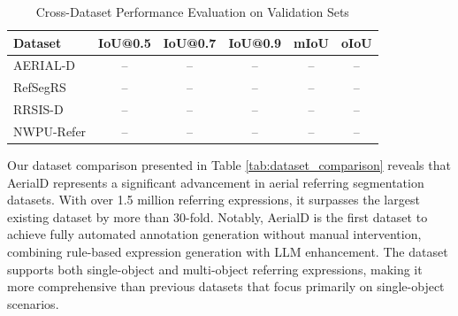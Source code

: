 \begin{table}[H]
\centering
\caption{Cross-Dataset Performance Evaluation on Validation Sets}
\label{tab:cross_dataset_results}
\begin{tabular}{@{}lccccc@{}}
\toprule
\textbf{Dataset} & \textbf{IoU@0.5} & \textbf{IoU@0.7} & \textbf{IoU@0.9} & \textbf{mIoU} & \textbf{oIoU} \\
\midrule
AERIAL-D & -- & -- & -- & -- & -- \\
RefSegRS & -- & -- & -- & -- & -- \\
RRSIS-D & -- & -- & -- & -- & -- \\
NWPU-Refer & -- & -- & -- & -- & -- \\
\bottomrule
\end{tabular}
\end{table}

\begin{table}[H]
\centering
\caption{Comparison with Existing RRSIS Datasets}
\label{tab:dataset_comparison}
\end{table}

Our dataset comparison presented in Table \ref{tab:dataset_comparison} reveals that AerialD represents a significant advancement in aerial referring segmentation datasets. With over 1.5 million referring expressions, it surpasses the largest existing dataset by more than 30-fold. Notably, AerialD is the first dataset to achieve fully automated annotation generation without manual intervention, combining rule-based expression generation with LLM enhancement. The dataset supports both single-object and multi-object referring expressions, making it more comprehensive than previous datasets that focus primarily on single-object scenarios.

